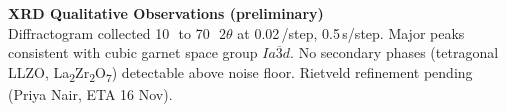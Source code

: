 \begin{tcolorbox}[notebox, title={\faMicroscope\quad Raw Observations \& Measurements}]
  \vspace{8pt}
  \textbf{XRD Qualitative Observations (preliminary)}\\[3pt]
  {\small\color{Graphite}
    Diffractogram collected 10\,\textdegree\ to 70\,\textdegree\ $2\theta$ at
    0.02\,\textdegree/step, 0.5\,s/step.
    Major peaks consistent with cubic garnet space group $Ia\overline{3}d$.
    No secondary phases (tetragonal LLZO, La\textsubscript{2}Zr\textsubscript{2}O\textsubscript{7})
    detectable above noise floor. Rietveld refinement pending (Priya Nair, ETA 16 Nov).
  }

\end{tcolorbox}
